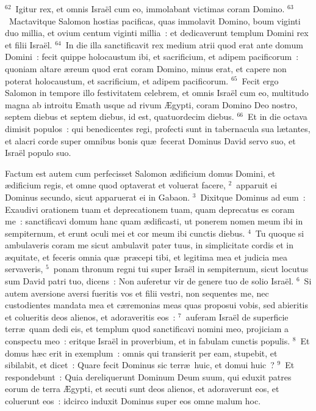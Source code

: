 ${}^{62}$~Igitur rex, et omnis Isra\"el cum eo, immolabant victimas coram Domino.
${}^{63}$~Mactavitque Salomon hostias pacificas, quas immolavit Domino, boum viginti duo millia, et ovium centum viginti millia~: et dedicaverunt templum Domini rex et filii Isra\"el.
${}^{64}$~In die illa sanctificavit rex medium atrii quod erat ante domum Domini~: fecit quippe holocaustum ibi, et sacrificium, et adipem pacificorum~: quoniam altare \ae reum quod erat coram Domino, minus erat, et capere non poterat holocaustum, et sacrificium, et adipem pacificorum.
${}^{65}$~Fecit ergo Salomon in tempore illo festivitatem celebrem, et omnis Isra\"el cum eo, multitudo magna ab introitu Emath usque ad rivum \AE gypti, coram Domino Deo nostro, septem diebus et septem diebus, id est, quatuordecim diebus.
${}^{66}$~Et in die octava dimisit populos~: qui benedicentes regi, profecti sunt in tabernacula sua l\ae tantes, et alacri corde super omnibus bonis qu\ae\ fecerat Dominus David servo suo, et Isra\"el populo suo.

\lettrine[lines=10,image=true,loversize=0.05,lraise=-0.03]{F}{}actum est autem cum perfecisset Salomon \ae dificium domus Domini, et \ae dificium regis, et omne quod optaverat et voluerat facere,
${}^{2}$~apparuit ei Dominus secundo, sicut apparuerat ei in Gabaon.
${}^{3}$~Dixitque Dominus ad eum~: Exaudivi orationem tuam et deprecationem tuam, quam deprecatus es coram me~: sanctificavi domum hanc quam \ae dificasti, ut ponerem nomen meum ibi in sempiternum, et erunt oculi mei et cor meum ibi cunctis diebus.
${}^{4}$~Tu quoque si ambulaveris coram me sicut ambulavit pater tuus, in simplicitate cordis et in \ae quitate, et feceris omnia qu\ae\ pr\ae cepi tibi, et legitima mea et judicia mea servaveris,
${}^{5}$~ponam thronum regni tui super Isra\"el in sempiternum, sicut locutus sum David patri tuo, dicens~: Non auferetur vir de genere tuo de solio Isra\"el.
${}^{6}$~Si autem aversione aversi fueritis vos et filii vestri, non sequentes me, nec custodientes mandata mea et c\ae remonias meas quas proposui vobis, sed abieritis et colueritis deos alienos, et adoraveritis eos~:
${}^{7}$~auferam Isra\"el de superficie terr\ae\ quam dedi eis, et templum quod sanctificavi nomini meo, projiciam a conspectu meo~: eritque Isra\"el in proverbium, et in fabulam cunctis populis.
${}^{8}$~Et domus h\ae c erit in exemplum~: omnis qui transierit per eam, stupebit, et sibilabit, et dicet~: Quare fecit Dominus sic terr\ae\ huic, et domui huic~?
${}^{9}$~Et respondebunt~: Quia dereliquerunt Dominum Deum suum, qui eduxit patres eorum de terra \AE gypti, et secuti sunt deos alienos, et adoraverunt eos, et coluerunt eos~: idcirco induxit Dominus super eos omne malum hoc.



